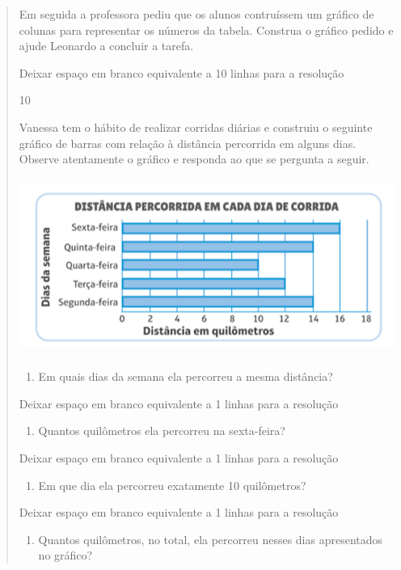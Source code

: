 \begin{mdframed}[linewidth=2pt,linecolor=salmao,roundcorner=2pt]
\begin{itemize}
{\begin{itemize}
\begin{escolha}
{\begin{quote}
{\begin{escolha}
{{{Em seguida a professora pediu que os alunos contruíssem um gráfico de
colunas para representar os números da tabela. Construa o gráfico pedido
e ajude Leonardo a concluir a tarefa.

Deixar espaço em branco equivalente a 10 linhas para a resolução

\num{10}

Vanessa tem o hábito de realizar corridas diárias e construiu o seguinte
gráfico de barras com relação à distância percorrida em alguns dias. Observe atentamente o gráfico e responda ao que se pergunta a seguir.

\includegraphics[width=5.22545in,height=2.25853in]{media/image103.png}

\begin{enumerate}
\item
  Em quais dias da semana ela percorreu a mesma distância?
\end{enumerate}

Deixar espaço em branco equivalente a 1 linhas para a resolução

\begin{enumerate}
\item
  Quantos quilômetros ela percorreu na sexta-feira?
\end{enumerate}

Deixar espaço em branco equivalente a 1 linhas para a resolução

\begin{enumerate}
\item
  Em que dia ela percorreu exatamente 10 quilômetros?
\end{enumerate}

Deixar espaço em branco equivalente a 1 linhas para a resolução

\begin{enumerate}
\item
  Quantos quilômetros, no total, ela percorreu nesses dias apresentados
  no gráfico?
\end{enumerate}

}}}
\end{escolha}}
\end{quote}}
\end{escolha}
\end{itemize}}
\end{itemize}
\end{mdframed}
